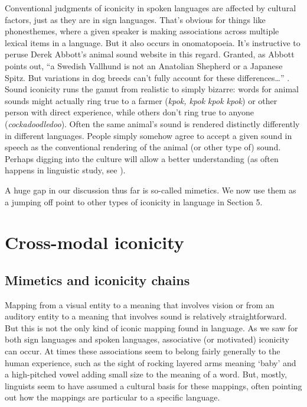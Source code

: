 \documentclass[output=paper,
modfonts
]{LSP/langsci}
\begin{document}
Conventional judgments of iconicity in spoken languages are affected by
cultural factors, just as they are in sign languages. That's obvious for
things like phonesthemes, where a given speaker is making associations
across multiple lexical items in a language. But it also occurs in
onomatopoeia. It's instructive to peruse Derek Abbott's \citeyearpar{abbott2004} animal
sound website in this regard. Granted, as Abbott points out, ``a Swedish
Vallhund is not an Anatolian Shepherd or a Japanese Spitz. But
variations in dog breeds can't fully account for these
differences\ldots{}'' \citep{friedman2015}. Sound iconicity runs the gamut
from realistic to simply bizarre: words for animal sounds might actually
ring true to a farmer (\emph{kpok, kpok kpok kpok}) or other person with
direct experience, while others don't ring true to anyone
(\emph{cockadoodledoo}). Often the same animal's sound is rendered
distinctly differently in different languages. People simply somehow
agree to accept a given sound in speech as the conventional rendering of
the animal (or other type of) sound. Perhaps digging into the culture
will allow a better understanding (as often happens in linguistic study,
see \citealt{duranti2009}).

A huge gap in our discussion thus far is so-called mimetics. We now use
them as a jumping off point to other types of iconicity in language in
Section 5.

\section{Cross-modal iconicity }

\subsection{Mimetics and iconicity chains}

Mapping from a visual entity to a meaning that involves vision or from
an auditory entity to a meaning that involves sound is relatively
straightforward. But this is not the only kind of iconic mapping found
in language. As we saw for both sign languages and spoken languages,
associative (or motivated) iconicity can occur. At times these
associations seem to belong fairly generally to the human experience,
such as the sight of rocking layered arms meaning `baby' and a
high-pitched vowel adding small size to the meaning of a word. But,
mostly, linguists seem to have assumed a cultural basis for these
mappings, often pointing out how the mappings are particular to a
specific language.
\end{document}
